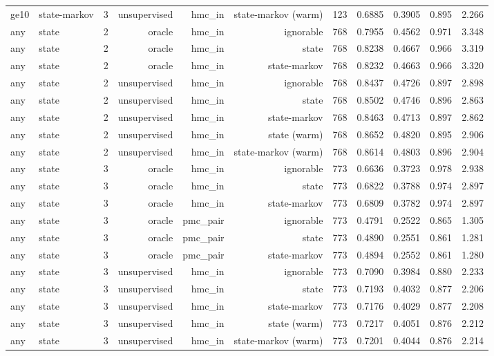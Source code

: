 \begin{table}[ht]
\begin{tabular}{llrrrrrrrrr}
ge10 & state-markov & 3 & unsupervised & hmc\_in & state-markov (warm) & 123 & 0.6885 & 0.3905 & 0.895 & 2.266 \\
any & state & 2 & oracle & hmc\_in & ignorable & 768 & 0.7955 & 0.4562 & 0.971 & 3.348 \\
any & state & 2 & oracle & hmc\_in & state & 768 & 0.8238 & 0.4667 & 0.966 & 3.319 \\
any & state & 2 & oracle & hmc\_in & state-markov & 768 & 0.8232 & 0.4663 & 0.966 & 3.320 \\
any & state & 2 & unsupervised & hmc\_in & ignorable & 768 & 0.8437 & 0.4726 & 0.897 & 2.898 \\
any & state & 2 & unsupervised & hmc\_in & state & 768 & 0.8502 & 0.4746 & 0.896 & 2.863 \\
any & state & 2 & unsupervised & hmc\_in & state-markov & 768 & 0.8463 & 0.4713 & 0.897 & 2.862 \\
any & state & 2 & unsupervised & hmc\_in & state (warm) & 768 & 0.8652 & 0.4820 & 0.895 & 2.906 \\
any & state & 2 & unsupervised & hmc\_in & state-markov (warm) & 768 & 0.8614 & 0.4803 & 0.896 & 2.904 \\
any & state & 3 & oracle & hmc\_in & ignorable & 773 & 0.6636 & 0.3723 & 0.978 & 2.938 \\
any & state & 3 & oracle & hmc\_in & state & 773 & 0.6822 & 0.3788 & 0.974 & 2.897 \\
any & state & 3 & oracle & hmc\_in & state-markov & 773 & 0.6809 & 0.3782 & 0.974 & 2.897 \\
any & state & 3 & oracle & pmc\_pair & ignorable & 773 & 0.4791 & 0.2522 & 0.865 & 1.305 \\
any & state & 3 & oracle & pmc\_pair & state & 773 & 0.4890 & 0.2551 & 0.861 & 1.281 \\
any & state & 3 & oracle & pmc\_pair & state-markov & 773 & 0.4894 & 0.2552 & 0.861 & 1.280 \\
any & state & 3 & unsupervised & hmc\_in & ignorable & 773 & 0.7090 & 0.3984 & 0.880 & 2.233 \\
any & state & 3 & unsupervised & hmc\_in & state & 773 & 0.7193 & 0.4032 & 0.877 & 2.206 \\
any & state & 3 & unsupervised & hmc\_in & state-markov & 773 & 0.7176 & 0.4029 & 0.877 & 2.208 \\
any & state & 3 & unsupervised & hmc\_in & state (warm) & 773 & 0.7217 & 0.4051 & 0.876 & 2.212 \\
any & state & 3 & unsupervised & hmc\_in & state-markov (warm) & 773 & 0.7201 & 0.4044 & 0.876 & 2.214 \\

\end{tabular}
\end{table}
